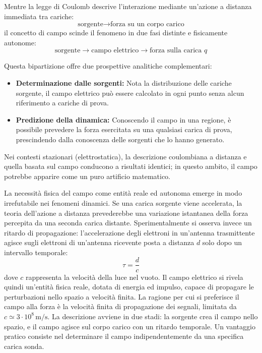 \documentclass[11pt,a4paper]{article}
\begin{document}
Mentre la legge di Coulomb descrive l'interazione mediante un'azione a distanza immediata tra cariche:
\[
\text{sorgente} \longrightarrow \text{forza su un corpo carico}
\]
il concetto di campo scinde il fenomeno in due fasi distinte e fisicamente autonome:
\[
\text{sorgente} \longrightarrow \text{campo elettrico} \longrightarrow \text{forza sulla carica } q
\]

Questa bipartizione offre due prospettive analitiche complementari:
\begin{itemize}
	\item \textbf{Determinazione dalle sorgenti:} Nota la distribuzione delle cariche sorgente, il campo elettrico può essere calcolato in ogni punto senza alcun riferimento a cariche di prova.
	\item \textbf{Predizione della dinamica:} Conoscendo il campo in una regione, è possibile prevedere la forza esercitata su una qualsiasi carica di prova, prescindendo dalla conoscenza delle sorgenti che lo hanno generato.
\end{itemize}

Nei contesti stazionari (elettrostatica), la descrizione coulombiana a distanza e quella basata sul campo conducono a risultati identici; in questo ambito, il campo potrebbe apparire come un puro artificio matematico.

La necessità fisica del campo come entità reale ed autonoma emerge in modo irrefutabile nei fenomeni dinamici. Se una carica sorgente viene accelerata, la teoria dell'azione a distanza prevederebbe una variazione istantanea della forza percepita da una seconda carica distante. Sperimentalmente si osserva invece un ritardo di propagazione: l'accelerazione degli elettroni in un'antenna trasmittente agisce sugli elettroni di un'antenna ricevente posta a distanza $d$ solo dopo un intervallo temporale:
\begin{equation}
	\tau = \frac{d}{c}
\end{equation}
dove $c$ rappresenta la velocità della luce nel vuoto. Il campo elettrico si rivela quindi un'entità fisica reale, dotata di energia ed impulso, capace di propagare le perturbazioni nello spazio a velocità finita.
La ragione per cui si preferisce il campo alla forza è la velocità finita di propagazione dei segnali, limitata da $c\simeq 3\cdot 10^{8}\,\mathrm{m/s}$. La descrizione avviene in due stadi: la sorgente crea il campo nello spazio, e il campo agisce sul corpo carico con un ritardo temporale. Un vantaggio pratico consiste nel determinare il campo indipendentemente da una specifica carica sonda.
\end{document}
